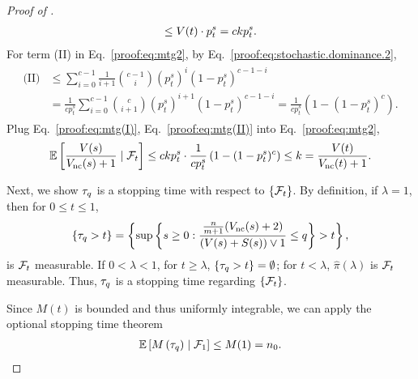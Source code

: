 \begin{proof}[Proof of ]
\begin{align}
    \le {V}(t) \cdot p_t^s
    = ck p_t^s.
\end{align}
For term (II) in Eq.~\eqref{proof:eq:mtg2}, by Eq.~\eqref{proof:eq:stochastic.dominance.2},
\begin{align}\label{proof:eq:mtg(II)}
    \begin{split}
        \text{(II)}
        &\le \sum_{i=0}^{c-1} \frac{1}{i+1} \binom{c-1}{i} (p_t^s)^{i} (1-p_t^s)^{c-1-i}\\
        &= \frac{1}{cp_{t}^s}\sum_{i=0}^{c-1} \binom{c}{i+1} (p_t^s)^{i+1} (1-p_t^s)^{c-1-i}
        =\frac{1}{c p_{t}^s} \left(1 - (1-p_t^s)^{c} \right).
    \end{split}
\end{align}
Plug Eq.~\eqref{proof:eq:mtg(I)}, Eq.~\eqref{proof:eq:mtg(II)} into Eq.~\eqref{proof:eq:mtg2},
\begin{align*}
    \mathbb{E}\left[ \frac{{V}(s)}{{V_{\text{nc}}}(s) + 1} \mid \mathcal{F}_t \right]
    \le ck p_t^s \cdot \frac{1}{c p_{t}^s} \left(1 - (1-p_t^s)^{c} \right)
    \le k
    = \frac{{V}(t)}{{V_{\text{nc}}}(t) + 1}.
\end{align*}


Next, we show ${\tau_q}$ is a stopping time with respect to $\{\mathcal{F}_t\}$.
By definition, if $\lambda = 1$, then for $0 \le t \le 1$,
\begin{align*}
    \{{\tau_q} > t\}
    = \left\{\sup\left\{s \ge 0: \frac{\frac{{n}}{m+1}({V_{\text{nc}}}(s) + 2)}{({V}(s) + {S}(s)) \vee 1} \le q \right\} > t \right\},
\end{align*}
is $\mathcal{F}_t$ measurable.
If $0 < \lambda < 1$, for $t \ge \lambda$, $\{{\tau_q} > t\} = \emptyset$; for $t < \lambda$, $\hat{\pi}(\lambda)$ is $\mathcal{F}_t$ measurable.
Thus, ${\tau_q}$ is a stopping time regarding $\{\mathcal{F}_t\}$.


Since $M(t)$ is bounded and thus uniformly integrable, we can apply the optional stopping time theorem
 \begin{align}\label{proof:eq:super.martingale}
    \mathbb{E}\left[M\left({\tau_q}\right) \mid \mathcal{F}_1\right]
    \le M(1)
    = {n_0}.
\end{align}


\end{proof}
